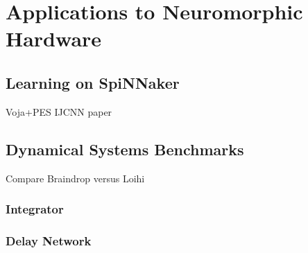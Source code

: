 \chapter{Applications to Neuromorphic Hardware}
\label{chapt:results}

\section{Learning on SpiNNaker}

Voja+PES IJCNN paper


\section{Dynamical Systems Benchmarks}

Compare Braindrop versus Loihi

\subsection{Integrator}

\subsection{Delay Network}

